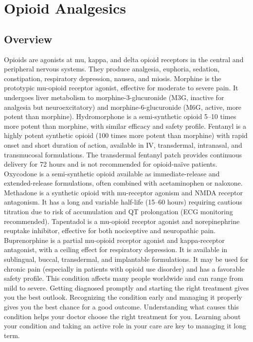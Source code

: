 \chapter{Opioid Analgesics}
\label{sec:Opioid Analgesics}

\section{Overview}
Opioids are agonists at mu, kappa, and delta opioid receptors in the central and peripheral nervous systems. They produce analgesia, euphoria, sedation, constipation, respiratory depression, nausea, and miosis. Morphine is the prototypic mu-opioid receptor agonist, effective for moderate to severe pain. It undergoes liver metabolism to morphine-3-glucuronide (M3G, inactive for analgesia but neuroexcitatory) and morphine-6-glucuronide (M6G, active, more potent than morphine). Hydromorphone is a semi-synthetic opioid 5--10 times more potent than morphine, with similar efficacy and safety profile. Fentanyl is a highly potent synthetic opioid (100 times more potent than morphine) with rapid onset and short duration of action, available in IV, transdermal, intranasal, and transmucosal formulations. The transdermal fentanyl patch provides continuous delivery for 72 hours and is not recommended for opioid-na{\"i}ve patients. Oxycodone is a semi-synthetic opioid available as immediate-release and extended-release formulations, often combined with acetaminophen or naloxone. Methadone is a synthetic opioid with mu-receptor agonism and NMDA receptor antagonism. It has a long and variable half-life (15--60 hours) requiring cautious titration due to risk of accumulation and QT prolongation (ECG monitoring recommended). Tapentadol is a mu-opioid receptor agonist and norepinephrine reuptake inhibitor, effective for both nociceptive and neuropathic pain. Buprenorphine is a partial mu-opioid receptor agonist and kappa-receptor antagonist, with a ceiling effect for respiratory depression. It is available in sublingual, buccal, transdermal, and implantable formulations. It may be used for chronic pain (especially in patients with opioid use disorder) and has a favorable safety profile. This condition affects many people worldwide and can range from mild to severe. Getting diagnosed promptly and starting the right treatment gives you the best outlook. Recognizing the condition early and managing it properly gives you the best chance for a good outcome. Understanding what causes this condition helps your doctor choose the right treatment for you. Learning about your condition and taking an active role in your care are key to managing it long term.

